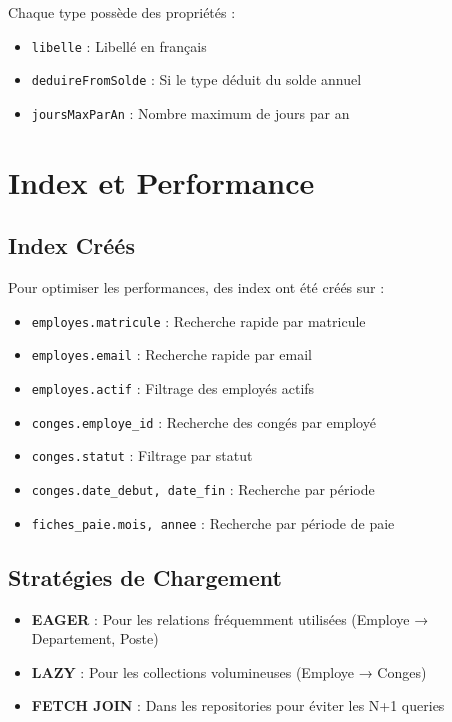 \documentclass[12pt,a4paper,twoside]{report}
\begin{document}
Chaque type possède des propriétés :
\begin{itemize}
    \item \texttt{libelle} : Libellé en français
    \item \texttt{deduireFromSolde} : Si le type déduit du solde annuel
    \item \texttt{joursMaxParAn} : Nombre maximum de jours par an
\end{itemize}

\section{Index et Performance}

\subsection{Index Créés}

Pour optimiser les performances, des index ont été créés sur :
\begin{itemize}
    \item \texttt{employes.matricule} : Recherche rapide par matricule
    \item \texttt{employes.email} : Recherche rapide par email
    \item \texttt{employes.actif} : Filtrage des employés actifs
    \item \texttt{conges.employe\_id} : Recherche des congés par employé
    \item \texttt{conges.statut} : Filtrage par statut
    \item \texttt{conges.date\_debut, date\_fin} : Recherche par période
    \item \texttt{fiches\_paie.mois, annee} : Recherche par période de paie
\end{itemize}

\subsection{Stratégies de Chargement}

\begin{itemize}
    \item \textbf{EAGER} : Pour les relations fréquemment utilisées (Employe → Departement, Poste)
    \item \textbf{LAZY} : Pour les collections volumineuses (Employe → Conges)
    \item \textbf{FETCH JOIN} : Dans les repositories pour éviter les N+1 queries
\end{itemize}
\end{document}
